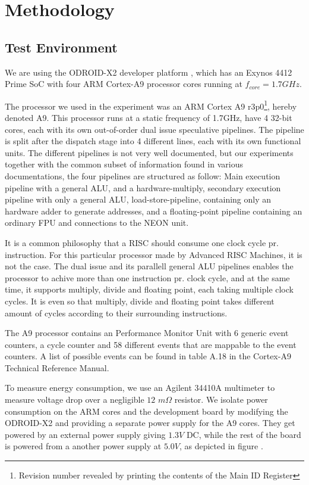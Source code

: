 \section{Methodology}


\subsection{Test Environment}
We are using the ODROID-X2 developer platform \cite{odroid-x2}, which has an
Exynos 4412 Prime SoC with four ARM Cortex-A9 processor cores running at
$f_{core} = 1.7 GHz$.

The processor we used in the experiment was an ARM Cortex A9
r3p0\footnote{Revision number revealed by printing the contents of the Main ID
Register}, hereby denoted A9. This processor runs at a static frequency of
1.7GHz, have 4 32-bit cores, each with its own out-of-order dual issue
speculative pipelines\cite{armtech}. The pipeline is split after the dispatch
stage into 4 different lines, each with its own functional units. The different
pipelines is not very well documented, but our experiments together with the
common subset of information found in various
documentations\cite{armtech}\cite{7cpu}\cite{lotofdocs}, the four pipelines are
structured as follow: Main execution pipeline with a  general ALU, and a
hardware-multiply, secondary execution pipeline with only a general ALU,
load-store-pipeline, containing only an hardware adder to generate addresses,
and a floating-point pipeline containing an ordinary FPU and connections to the
NEON unit.

It is a common philosophy that a RISC should consume one clock cycle pr.
instruction\cite{unknown}.  For this particular processor made by Advanced RISC
Machines, it is not the case. The dual issue and its parallell general ALU
pipelines enables the processor to achive more than one instruction pr. clock
cycle, and at the same time, it supports multiply, divide and floating point,
each taking multiple clock cycles. It is even so that multiply, divide and
floating point takes different amount of cycles according to their surrounding
instructions.

The A9 processor contains an Performance Monitor Unit with 6 generic event
counters, a cycle counter and 58 different events that are mappable to the event
counters\cite{armtech}. A list of possible events can be found in table A.18 in
the Cortex-A9 Technical Reference Manual\cite{armtech}.

To measure energy consumption, we use an Agilent 34410A multimeter to measure
voltage drop over a negligible $12$ $m\Omega$ resistor. We isolate power
consumption on the ARM cores and the development board by modifying the
ODROID-X2 and providing a separate power supply for the A9 cores. They get
powered by an external power supply giving $1.3V$ DC, while the rest of the
board is powered from a another power supply at $5.0V$, as depicted in figure
.

